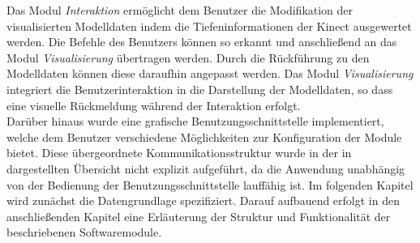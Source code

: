 Das Modul \textit{Interaktion} ermöglicht dem Benutzer die Modifikation der visualisierten Modelldaten indem die Tiefeninformationen der Kinect ausgewertet werden. Die Befehle des Benutzers können so erkannt und anschließend an das Modul \textit{Visualisierung} übertragen werden. Durch die Rückführung zu den Modelldaten können diese daraufhin angepasst werden. Das Modul \textit{Visualisierung} integriert die Benutzerinteraktion in die Darstellung der Modelldaten, so dass eine visuelle Rückmeldung während der Interaktion erfolgt.\\

Darüber hinaus wurde eine grafische Benutzungsschnittstelle implementiert, welche dem Benutzer verschiedene Möglichkeiten zur Konfiguration der Module bietet. Diese übergeordnete Kommunikationsstruktur wurde in der in  dargestellten Übersicht nicht explizit aufgeführt, da die Anwendung unabhängig von der Bedienung der Benutzungsschnittstelle lauffähig ist. Im folgenden Kapitel wird zunächst die Datengrundlage spezifiziert. Darauf aufbauend erfolgt in den anschließenden Kapitel eine Erläuterung der Struktur und Funktionalität der beschriebenen Softwaremodule.
%
%
%
%
